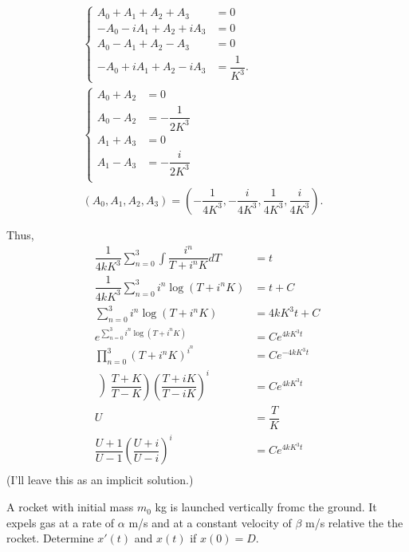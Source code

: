 \documentclass[11pt]{article}
\begin{document}
\begin{solution*}
\begin{align}
            \begin{cases}
                A_0 + A_1 + A_2 + A_3 &= 0 \\ 
                -A_0 - iA_1 + A_2 + iA_3 &= 0 \\
                A_0 - A_1 + A_2 - A_3 &= 0 \\ 
                -A_0 + iA_1 + A_2 - iA_3 &= \dfrac{1}{K^3}. 
            \end{cases}& \\
            \begin{cases}
                A_0 + A_2 &= 0 \\ 
                A_0 - A_2 &= -\dfrac{1}{2K^3} \\ 
                A_1 + A_3 &= 0 \\ 
                A_1 - A_3 &= -\dfrac{i}{2K^3} \\
            \end{cases}& \\ 
            \left(A_0,A_1,A_2,A_3 \right) = \left(-\dfrac{1}{4K^3}, -\dfrac{i}{4K^3}, \dfrac{1}{4K^3}, \dfrac{i}{4K^3}\right).& \\~\\
        \end{align}
        Thus,
        \begin{align}
            \dfrac{1}{4kK^3} \sum_{n=0}^3 \int \dfrac{i^n}{T + i^nK}dT &= t \\ 
            \dfrac{1}{4kK^3} \sum_{n=0}^3 i^n \log (T + i^n K) &= t+C \\ 
            \sum_{n=0}^3 i^n \log (T + i^n K) &= 4kK^3t + C \\ 
            e^{\sum_{n=0}^3 i^n \log (T + i^n K)} &= Ce^{4kK^3t} \\
            \prod_{n=0}^3 (T+i^nK)^{i^n}&= Ce^{-4kK^3t} \\ 
            \left)\dfrac{T+K}{T-K}\right)\left(\dfrac{T+iK}{T-iK}\right)^i &= Ce^{4kK^3t} \\
            U &= \dfrac{T}{K} \\ 
            \dfrac{U+1}{U-1}\left(\dfrac{U+i}{U-i}\right)^i &= Ce^{4kK^3t} \\
        \end{align}    
        (I'll leave this as an implicit solution.)
    \end{solution*}
    \begin{problem}[Problem 3a]
        A rocket with initial mass $m_0$ kg is launched vertically fromc the ground. It expels gas at a rate of $\alpha$ m/s and at a constant velocity of $\beta$ m/s relative the the rocket.
        Determine $x'(t)$ and $x(t)$ if $x(0) = D$.
    \end{problem}
\end{document}
